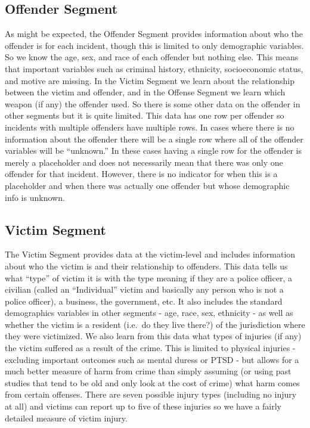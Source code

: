\documentclass[
]{krantz}
\begin{document}
\subsection{Offender Segment}\label{offender-segment}

As might be expected, the Offender Segment provides
information about who the offender is for each incident,
though this is limited to only demographic variables. So we
know the age, sex, and race of each offender but nothing
else. This means that important variables such as criminal
history, ethnicity, socioeconomic status, and motive are
missing. In the Victim Segment we learn about the
relationship between the victim and offender, and in the
Offense Segment we learn which weapon (if any) the offender
used. So there is some other data on the offender in other
segments but it is quite limited. This data has one row per
offender so incidents with multiple offenders have multiple
rows. In cases where there is no information about the
offender there will be a single row where all of the
offender variables will be ``unknown.'' In these cases
having a single row for the offender is merely a placeholder
and does not necessarily mean that there was only one
offender for that incident. However, there is no indicator
for when this is a placeholder and when there was actually
one offender but whose demographic info is unknown.

\subsection{Victim Segment}\label{victim-segment}

The Victim Segment provides data at the victim-level and
includes information about who the victim is and their
relationship to offenders. This data tells us what ``type''
of victim it is with the type meaning if they are a police
officer, a civilian (called an ``Individual'' victim and
basically any person who is not a police officer), a
business, the government, etc. It also includes the standard
demographics variables in other segments - age, race, sex,
ethnicity - as well as whether the victim is a resident
(i.e.~do they live there?) of the jurisdiction where they
were victimized. We also learn from this data what types of
injuries (if any) the victim suffered as a result of the
crime. This is limited to physical injuries - excluding
important outcomes such as mental duress or PTSD - but
allows for a much better measure of harm from crime than
simply assuming (or using past studies that tend to be old
and only look at the cost of crime) what harm comes from
certain offenses. There are seven possible injury types
(including no injury at all) and victims can report up to
five of these injuries so we have a fairly detailed measure
of victim injury.
\end{document}
